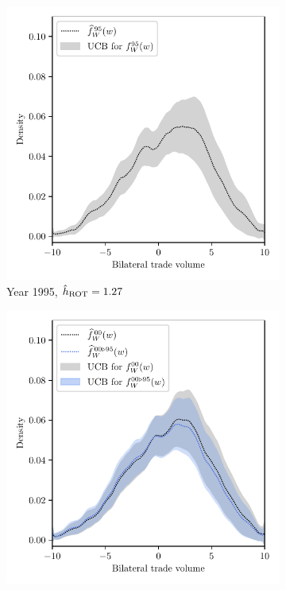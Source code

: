 \begin{figure}[ht]
  \centering
  \begin{subfigure}{0.32\textwidth}
    \centering
    \includegraphics[scale=0.48]{graphics/trade_plot_parametric_1995.pdf}
    \caption{Year 1995, $\hat h_{\operatorname{ROT}} = 1.27$}
  \end{subfigure}
  \begin{subfigure}{0.32\textwidth}
    \centering
    \includegraphics[scale=0.48]{graphics/trade_plot_parametric_1995_2000.pdf}

\end{subfigure}
\end{figure}
